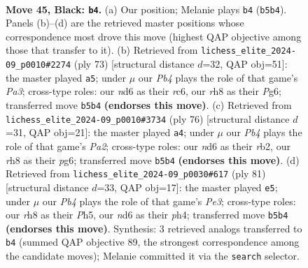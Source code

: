 \documentclass[11pt]{article}
\begin{document}
\clearpage

\begin{figure}[p]\centering
\begin{subfigure}{0.46\textwidth}\centering
\resizebox{\linewidth}{!}{%
\newchessgame
\chessboard[
  setfen={7R/6p1/3Nppk1/1p5p/3P1P1P/1r2P1PK/8/8 b - - 11 45},
  showmover=false,
  pgfstyle=straightmove, color=movearrow, markmove={b5-b4}
]}
\caption{}
\end{subfigure}\hfill
\begin{subfigure}{0.46\textwidth}\centering
\resizebox{\linewidth}{!}{%
\newchessgame
\chessboard[
  setfen={8/8/p1R1p1p1/4k3/r1P1p2p/4P2P/5PP1/6K1 b - - 1 37},
  showmover=false,
  pgfstyle=straightmove, color=movearrow, markmove={a6-a5}
]}
\caption{}
\end{subfigure}
\\[4pt]
\begin{subfigure}{0.46\textwidth}\centering
\resizebox{\linewidth}{!}{%
\newchessgame
\chessboard[
  setfen={8/8/Rp3pp1/3p1k1p/3P3P/5KP1/Pr3P2/8 w - - 2 39},
  showmover=false,
  pgfstyle=straightmove, color=movearrow, markmove={a2-a4}
]}
\caption{}
\end{subfigure}\hfill
\begin{subfigure}{0.46\textwidth}\centering
\resizebox{\linewidth}{!}{%
\newchessgame
\chessboard[
  setfen={8/p7/1r2pk2/2p2p1p/2P2P1P/1PK1P3/P2R4/8 b - - 0 41},
  showmover=false,
  pgfstyle=straightmove, color=movearrow, markmove={e6-e5}
]}
\caption{}
\end{subfigure}
\caption{\textbf{Move 45, Black: \texttt{b4}.} (a) Our position; Melanie plays \texttt{b4} (\texttt{b5b4}). Panels (b)--(d) are the retrieved master positions whose correspondence most drove this move (highest QAP objective among those that transfer to it). (b) Retrieved from \texttt{lichess\_elite\_2024-09\_p0010\#2274} (ply 73) [structural distance $d$=32, QAP obj=51]: the master played \texttt{a5}; under $\mu$ our \emph{Pb4} plays the role of that game's \emph{Pa3}; cross-type roles: our \emph{n}d6 as their \emph{r}c6, our \emph{r}h8 as their \emph{P}g6; transferred move \texttt{b5b4} \textbf{(endorses this move)}. (c) Retrieved from \texttt{lichess\_elite\_2024-09\_p0010\#3734} (ply 76) [structural distance $d$=31, QAP obj=21]: the master played \texttt{a4}; under $\mu$ our \emph{Pb4} plays the role of that game's \emph{Pa2}; cross-type roles: our \emph{n}d6 as their \emph{r}b2, our \emph{r}h8 as their \emph{p}g6; transferred move \texttt{b5b4} \textbf{(endorses this move)}. (d) Retrieved from \texttt{lichess\_elite\_2024-09\_p0030\#617} (ply 81) [structural distance $d$=33, QAP obj=17]: the master played \texttt{e5}; under $\mu$ our \emph{Pb4} plays the role of that game's \emph{Pe3}; cross-type roles: our \emph{r}h8 as their \emph{P}h5, our \emph{n}d6 as their \emph{p}h4; transferred move \texttt{b5b4} \textbf{(endorses this move)}. Synthesis: 3 retrieved analogs transferred to \texttt{b4} (summed QAP objective 89, the strongest correspondence among the candidate moves); Melanie committed it via the \texttt{search} selector.}
\label{fig:thought-m89}
\end{figure}
\end{document}

